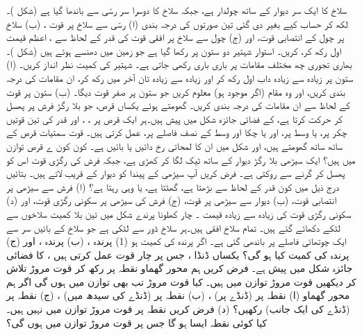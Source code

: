 \setcounter{questioncounter}{0}
سلاخ  کا ایک سر دیوار  کے ساتھ چولدار ہے، جبکہ سلاخ کا دوسرا سر  رسّی سے باندھا گیا ہے (شکل )۔ لکھ کر حساب کیے بغیر دی گئی تین صورتوں کی درجہ بندی  (ا)  رسّی سے سلاخ پر قوت ، (ب) سلاخ پر چول کے انتصابی قوت،  اور (ج) چول سے سلاخ پر افقی قوت کی قدر کے لحاظ سے ، اعظم قیمت اول رکھ کر، کریں۔
استوار شہتیر  دو ستون پر  رکھا گیا ہے جو زمین  میں دھنسے  ہوئے ہیں  (شکل )۔بھاری  تجوری چھ مختلف مقامات پر   باری باری رکھی جاتی ہے۔ شہتیر کی کمیت نظر انداز کریں۔ (ا)  ستون  پر زیادہ سے زیادہ داب اول رکھ کر اور زیادہ سے زیادہ تان آخر میں رکھ کر، ان مقامات  کی درجہ بندی کریں، اور وہ مقام  (اگر موجود ہو)  معلوم کریں جو ستون پر صفر قوت دیگا۔ (ب) ستون  پر قوت کے لحاظ سے ان مقامات کی درجہ بندی کریں۔
گھومتے ہوئے یکساں قرص، جو بلا رگڑ فرش پر  پھسل کر حرکت کرتا ہے،  کے  فضائی جائزہ شکل  میں پیش ہیں۔ہر ایک قرص پر ، ، اور  قدر کی تین قوتیں  چکر پر، یا وسط پر، اور یا چکا اور وسط کے نصف فاصلے پر، عمل کرتی ہیں۔ قوت سمتیات قرص کے ساتھ ساتھ گھومتے ہیں، اور شکل  میں  ان کا لمحاتی رخ دائیں یا بائیں ہے۔ کون کون ے قرص توازن میں ہیں؟
ایک سیڑھی بلا رگڑ دیوار کے ساتھ  ٹیک لگا کر کھڑی ہے، جبکہ فرش کی رگڑی قوت اس کو پھسل کر گرنے سے روکتی ہے۔ فرض کریں آپ سیڑھی کے پیندا کو دیوار کے قریب لاتے ہیں۔ بتائیں درج ذیل میں کون قدر کے لحاظ سے بڑھتا ہے، گھٹتا ہے،  یا وہی رہتا ہے؟ (ا)  فرش  سے سیڑھی پر  انتصابی قوت،  (ب) دیوار سے سیڑھی پر قوت، (ج)  فرش کی سیڑھی پر سکونی رگڑی قوت، اور (د)  سکونی رگڑی قوت کی زیادہ سے زیادہ قیمت ۔
چار کھلونا  پرندے  شکل  میں تین بلا کمیت سلاخوں سے لٹکے  دکھائے گئے ہیں۔ تمام سلاخ افقی ہیں۔ہر سلاخ ڈور سے لٹکی ہے  جو سلاخ کے بائیں سر سے ایک چوتھائی فاصلے پر باندھی گئی ہے۔ اگر پرندہ  کی کمیت  ہو (1) پرندہ ، (ب) پرندہ ، اور (ج) پرندہ  کی کمیت کیا ہو  گی؟
یکساں ڈنڈا  ، جس پر چار قوت عمل کرتی ہیں ، کا فضائی جائزہ شکل  میں پیش ہے۔ فرض کریں ہم محور گھماو نقطہ  پر  رکھ کر  قوت مروڑ تلاش کر دیکھیں  قوت مروڑ  توازن میں ہیں۔ کیا قوت مروڑ تب بھی توازن میں ہوں گی اگر ہم محور گھماو (ا) نقطہ    پر (ڈنڈے پر) ، (ب) نقطہ  پر  (ڈنڈے کی سیدھ میں)  ،  (ج) نقطہ  پر (ڈنڈے کی ایک جانب)  رکھیں؟ (د)  فرض کریں نقطہ  پر قوت مروڑ  توازن میں نہیں ہیں۔ کیا کوئی  نقطہ ایسا ہو گا جس پر قوت مروڑ توازن میں ہوں گی؟
